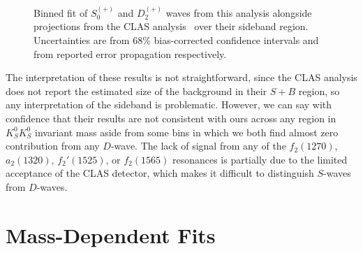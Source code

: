 \begin{figure}
  \begin{center}
    
  \end{center}
  \caption{Binned fit of $S_0^{(+)}$ and $D_2^{(+)}$ waves from this analysis alongside projections from the CLAS analysis~\cite{Chandavar2018} over their sideband region. Uncertainties are from $68\%$ bias-corrected confidence intervals and from reported error propagation respectively.}\label{fig:clas-comparison-sideband}
\end{figure}

The interpretation of these results is not straightforward, since the CLAS analysis does not report the estimated size of the background in their $S+B$ region, so any interpretation of the sideband is problematic. However, we can say with confidence that their results are not consistent with ours across any region in $K_S^0K_S^0$ invariant mass aside from some bins in which we both find almost zero contribution from any $D$-wave. The lack of signal from any of the $f_2(1270)$, $a_2(1320)$, $f_2'(1525)$, or $f_2(1565)$ resonances is partially due to the limited acceptance of the CLAS detector, which makes it difficult to distinguish $S$-waves from $D$-waves.


\section{Mass-Dependent Fits}\label{sec:mass-dependent-fits}

